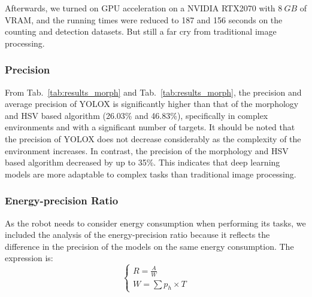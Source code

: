 \begin{table}[htb]
\centering
\caption{Results of the running time tests for the two algorithms}
\label{tab:running_time_test}
\end{table}

Afterwards, we turned on GPU acceleration on a NVIDIA RTX2070 with $8\ GB$ of VRAM, and the running times were reduced to 187 and 156 seconds on the counting and detection datasets. But still a far cry from traditional image processing.

\subsubsection{Precision}
From Tab.~\ref{tab:results_morph} and Tab.~\ref{tab:results_morph}, the precision and average precision of YOLOX is significantly higher than that of the morphology and HSV based algorithm (26.03\% and 46.83\%), specifically in complex environments and with a significant number of targets. It should be noted that the precision of YOLOX does not decrease considerably as the complexity of the environment increases. In contrast, the precision of the morphology and HSV based algorithm decreased by up to 35\%. This indicates that deep learning models are more adaptable to complex tasks than traditional image processing. 

\subsubsection{Energy-precision Ratio}

As the robot needs to consider energy consumption when performing its tasks, we included the analysis of the energy-precision ratio because it reflects the difference in the precision of the models on the same energy consumption. The expression is:
\begin{equation}
    \left\{\begin{matrix}
    R = \frac{A}{W}  \\
    W = \sum p_h\times T
    \end{matrix}\right.
\end{equation}

